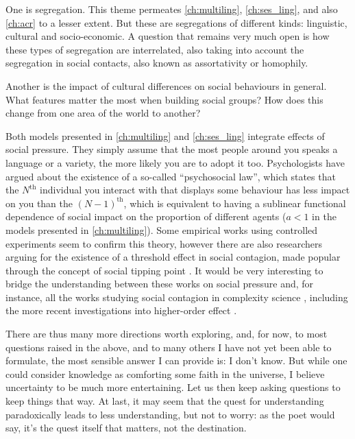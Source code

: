 \documentclass[../thesis.tex]{subfiles}
\begin{document}
One is segregation. This theme permeates \cref{ch:multiling},
\cref{ch:ses_ling}, and also \cref{ch:acr} to a lesser extent. But these are
segregations of different kinds: linguistic, cultural and socio-economic. A question
that remains very much open is how these types of segregation are interrelated, also
taking into account the segregation in social contacts, also known as assortativity or
homophily.

Another is the impact of cultural differences on social behaviours in general. What
features matter the most when building social groups? How does this change from one area
of the world to another?

Both models presented in \cref{ch:multiling} and \cref{ch:ses_ling} integrate effects of
social pressure. They simply assume that the most people around you speaks a language or
a variety, the more likely you are to adopt it too. Psychologists have argued about the
existence of a so-called ``psychosocial law'', which states that the $N^\text{th}$
individual you interact with that displays some behaviour has less impact on you than
the $(N - 1)^\text{th}$, which is equivalent to having a sublinear functional dependence
of social impact on the proportion of different agents ($a < 1$ in the models presented
in \cref{ch:multiling}). Some empirical works using controlled experiments seem to
confirm this theory, however there are also researchers arguing for the existence of a
threshold effect in social contagion, made popular through the concept of social tipping
point \cite{MilkoreitDefiningTipping2018}. It would be very interesting to bridge the
understanding between these works on social pressure and, for instance, all the works
studying social contagion in complexity science \cite{WattsInfluentialsNetworks2007},
including the more recent investigations into higher-order effect
\cite{IacopiniSimplicialModels2019}.

There are thus many more directions worth exploring, and, for now, to most questions
raised in the above, and to many others I have not yet been able to formulate, the most
sensible answer I can provide is: I don't know. But while one could consider knowledge
as comforting some faith in the universe, I believe uncertainty to be much more
entertaining. Let us then keep asking questions to keep things that way.
At last, it may seem that the quest for understanding paradoxically leads to less
understanding, but not to worry:
as the poet would say,
it's the quest itself that matters, not the destination.
\end{document}
